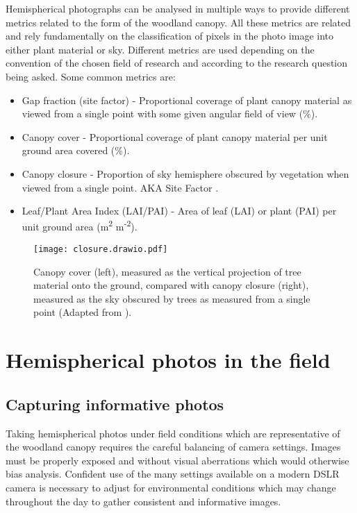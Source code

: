 \documentclass{article}
\begin{document}
Hemispherical photographs can be analysed in multiple ways to provide different metrics related to the form of the woodland canopy. All these metrics are related and rely fundamentally on the classification of pixels in the photo image into either plant material or sky. Different metrics are used depending on the convention of the chosen field of research and according to the research question being asked. Some common metrics are:

\begin{itemize}
	\item{Gap fraction (site factor) - Proportional coverage of plant canopy material as viewed from a single point with some given angular field of view (\%).}
	\item{Canopy cover - Proportional coverage of plant canopy material per unit ground area covered (\%).}
	\item{Canopy closure - Proportion of sky hemisphere obscured by vegetation when viewed from a single point. AKA Site Factor \citep{Anderson1964}.}
	\item{Leaf/Plant Area Index (LAI/PAI) - Area of leaf (LAI) or plant (PAI) per unit ground area (m\textsuperscript{2} m\textsuperscript{-2}).}
\end{itemize}

\begin{figure}[H]
\centering
	\texttt{[image: closure.drawio.pdf]}
	\caption{Canopy cover (left), measured as the vertical projection of tree material onto the ground, compared with canopy closure (right), measured as the sky obscured by trees as measured from a single point (Adapted from \citealt{Jennings1999}).}
	\label{closure}
\end{figure}

\section{Hemispherical photos in the field}

\subsection{Capturing informative photos}

Taking hemispherical photos under field conditions which are representative of the woodland canopy requires the careful balancing of camera settings. Images must be properly exposed and without visual aberrations which would otherwise bias analysis. Confident use of the many settings available on a modern DSLR camera is necessary to adjust for environmental conditions which may change throughout the day to gather consistent and informative images.
\end{document}
